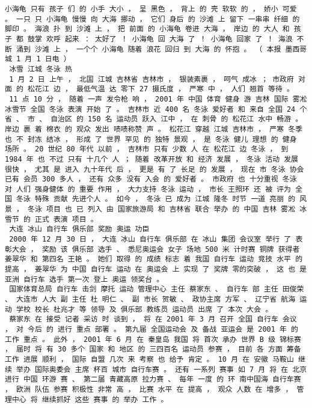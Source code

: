\documentclass{article}
\begin{document}
\begin{Verbatim}[commandchars=\\\{\}]
 小海龟 只有 孩子 们 的 小手 大小 ， 呈 黑色 ， 背上 的 壳 软软 的 ， 娇小 可爱 。 一只 只 小海龟 慢慢 向 大海 挪动 ， 它们 身后 的 沙滩 上 留下 一串串 纤细 的 脚印 。 海浪 扑 到 沙滩 上 ， 把 前面 的 小海龟 卷进 大海 ， 岸边 的 大人 和 孩子 都 鼓掌 欢呼 起来 ： 太好了 ！ 小海龟 回 大海 了 ！ 小海龟 回家 了 ！ 海浪 不断 涌到 沙滩 上 ， 一个个 小海龟 随着 浪花 回归 到 大海 的 怀抱 。 （ 本报 墨西哥城 1 月 1 日电 ） 
 冰雪 江城 冬泳 热 
 1 月 2 日 上午 ， 北国 江城 吉林省 吉林市 ， 银装素裹 ， 呵气 成冰 ； 市政府 对面 的 松花江 边 ， 最低气温 达 零下 27 摄氏度 ， 严寒 中 ， 人们 翘首 等待 。 
 11 点 10 分 ， 随着 一声 发令枪 响 ， 2001 年 中国 体育 健身 游 吉林 国际 雾凇 冰雪节 全国 冬泳 表演 开始 了 。 吉林市 近 400 名 冬泳 爱好者 和 来自 全国 24 个省 、 市 、 自治区 的 150 名 运动员 跃入 江中 ， 在 刺骨 的 松花江 水中 畅游 。 岸边 裹 着 棉衣 的 观众 发出 啧啧称赞 声 。 松花江 穿越 江城 吉林市 ， 严寒 冬季 也 不 封冻 结冰 ， 形成 了 世界 罕见 的 独特 景观 ， 是 冬泳 健儿 理想 的 健身 场所 。 20 世纪 80 年代 以前 ， 吉林市 只有 少数 人 在 松花江 边 冬泳 ， 到 1984 年 也 不过 只有 十几个 人 ； 随着 改革开放 和 经济 发展 ， 冬泳 活动 发展 很快 ， 尤其 是 进入 九十年代 后 ， 更是 有 了 长足 的 发展 ， 现在 市 冬泳 协会 已有 会员 300 多人 ， 还有 众多 没有 入会 的 爱好者 。 市政府 也 十分重视 冬泳 对 人们 强身健体 的 重要 作用 ， 大力支持 冬泳 运动 ， 市长 王照环 还 被 评为 全国 冬泳 特殊 贡献 先进个人 。 如今 ， 冬泳 已 成为 江城 隆冬 时节 一道 亮丽 的 风景 ， 冬泳 项目 也 已 列入 由 国家旅游局 和 吉林省 联合 举办 的 中国 吉林 雾凇 冰雪节 的 正式 表演 项目 。 
 大连 冰山 自行车 俱乐部 奖励 奥运 功臣 
 2000 年 12 月 30 日 ， 大连 冰山 自行车 俱乐部 在 冰山 集团 会议室 举行 了 表彰大会 ， 奖励 该 俱乐部 选手 、 悉尼奥运会 女子 场地 500 米 计时赛 铜牌 获得者 姜翠华 和 第四名 王艳 。 她们 取得 的 成绩 标志 着 我国 自行车 运动 竞技 水平 的 提高 ， 姜翠华 为 中国 自行车 运动 在 奥运会 上 实现 了 奖牌 零的突破 ， 这 也 是 亚洲 自行车 选手 第一次 登上 奥运 领奖台 。 
 国家体育总局 自行车 击剑 摩托 运动 管理中心 主任 蔡家东 、 自行车 部 主任 田俊荣 、 大连市 人大 副 主任 杜 明仁 、 副 市长 贺敏 、 政协主席 方军 、 辽宁省 航海 运动 学校 校长 杜兆才 等 领导 及 俱乐部 教练员 运动员 出席 了 本次 大会 。 
 蔡家东 在 接受 记者 采访 时 谈到 ， 将 在 2001 年 3 月 召开 全国 自行车 会议 ， 对 今后 的 进行 重点 部署 。 第九届 全国运动会 及 备战 亚运会 是 2001 年 的 工作 重点 。 此外 ， 2001 年 6 月 在 秦皇岛 我国 将 首次 承办 世界 B 级 锦标赛 ， 届时 将 有 30 多个 国家 和 地区 的 三四百名 运动员 参赛 ， 目前 各 方面 筹备工作 进展 顺利 ， 国际 自盟 几次 来 考察 也 给予 肯定 。 10 月 在 安徽 马鞍山 继续 举办 国际奥委会 主席 杯百 城市 自行车赛 。 还有 一系列 赛事 如 7 月 将 在 北京 进行 中国 环游 赛 、 第二届 青藏高原 拉力赛 、 每年 一度 的 环 南中国海 自行车赛 ， 欧洲 队伍 参赛 积极性 非常 高 ， 比赛 水平 在 提高 ， 观众 人数 在 增多 ， 管理中心 将 继续抓好 这些 赛事 的 举办 工作 。 

\end{Verbatim}
\end{document}
